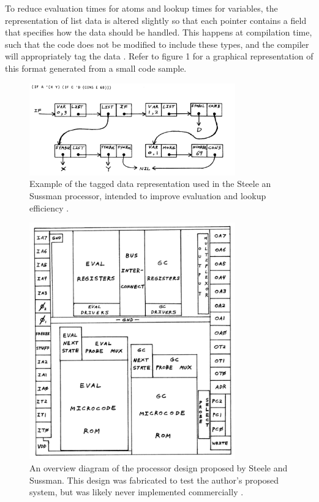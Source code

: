 \documentclass[journal]{IEEEtran}
\begin{document}
To reduce evaluation times for atoms and lookup times for variables, the representation of list data is altered slightly so that each pointer contains a field that specifies how the data should be handled. This happens at compilation time, such that the code does not be modified to include these types, and the compiler will appropriately tag the data \cite{ss}. Refer to figure 1 for a graphical representation of this format generated from a small code sample.

\begin{figure}[!t]
\centering
\includegraphics[width=3.5in]{SS_Data_Representation}
\caption{Example of the tagged data representation used in the Steele an Sussman processor, intended to improve evaluation and lookup efficiency \cite{ss}.}
\label{Data representation}
\end{figure}

\begin{figure}[!t]
\centering
\includegraphics[width=3.5in]{SS_Processor_Diagram}
\caption{An overview diagram of the processor design proposed by Steele and Sussman. This design was fabricated to test the author's proposed system, but was likely never implemented commercially \cite{ss}.}
\label{Data representation}
\end{figure}
\end{document}

